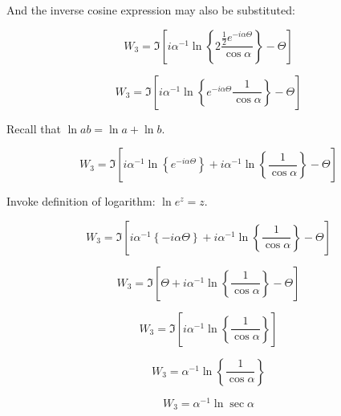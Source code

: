 \documentclass[12pt, a4paper, twoside, openright]{book}
\begin{document}
And the inverse cosine expression may also be substituted:

\begin{equation}
W_{3} = \Im \left[  
 i \alpha^{-1} \ln 
 \left\{ 2 \frac{\frac{1}{2} e^{-i \alpha \Theta}}{\cos \alpha} \right\} - \Theta
   \right]
\end{equation}

\begin{equation}
W_{3} = \Im \left[  
 i \alpha^{-1} \ln 
 \left\{ e^{-i \alpha \Theta} \frac{1 }{\cos \alpha} \right\} - \Theta
   \right]
\end{equation}

Recall that $\ln ab = \ln a + \ln b$.

\begin{equation}
W_{3} = \Im \left[  
 i \alpha^{-1} \ln 
 \left\{ e^{-i \alpha \Theta}  \right\}
+
i \alpha^{-1} \ln 
 \left\{ \frac{1 }{\cos \alpha} \right\} 
  - \Theta
   \right]
\end{equation}

Invoke definition of logarithm: $\ln e^z = z$.

\begin{equation}
W_{3} = \Im \left[  
 i \alpha^{-1} 
 \left\{ -i \alpha \Theta  \right\}
+
i \alpha^{-1} \ln 
 \left\{ \frac{1 }{\cos \alpha} \right\} 
  - \Theta
   \right]
\end{equation}


\begin{equation}
W_{3} = \Im \left[  
\Theta
+
i \alpha^{-1} \ln 
 \left\{ \frac{1 }{\cos \alpha} \right\} 
  - \Theta
   \right]
\end{equation}

\begin{equation}
W_{3} = \Im \left[  
i \alpha^{-1} \ln 
 \left\{ \frac{1 }{\cos \alpha} \right\} 
   \right]
\end{equation}

\begin{equation}
W_{3} =
\alpha^{-1} \ln 
 \left\{ \frac{1 }{\cos \alpha} \right\} 
\end{equation}

\begin{equation}
W_{3} =
\alpha^{-1} \ln \sec \alpha
\end{equation}

\end{document}
